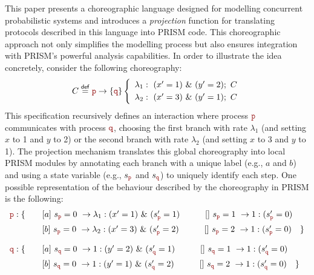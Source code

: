 This paper presents a choreographic language designed for modelling
concurrent probabilistic systems and introduces a {\em projection}
function for translating protocols described in this language into
PRISM code. This choreographic approach not only simplifies the
modelling process but also ensures integration with PRISM's powerful
analysis capabilities.
In order to illustrate the idea concretely, consider the following
choreography:
\[
  \begin{array}{lll}
    C \stackrel{\mathsf{def}}{=} \interactBase{\nr}{\nrr}
    \left\{
    \begin{array}{lll}
      \lambda_1: \ (x'=1)\ \&\ (y'=2);\ C\\[1mm]
      \lambda_2: \ (x'=3)\ \&\ (y'=1);\ C
    \end{array}
    \right.
  \end{array}
\]
This specification recursively defines an interaction where process
\(\role{p}\) communicates with process \(\role{q}\), choosing the
first branch with rate $\lambda_1$ (and setting \(x\) to 1 and \(y\)
to 2) or the second branch with rate $\lambda_2$ (and setting \(x\) to
3 and \(y\) to 1). 
The projection mechanism translates this global choreography into
local PRISM modules by annotating each branch with a unique label
(e.g., $a$ and $b$) and using a state variable (e.g., \(s_{\role p}\)
and \(s_{\role q}\)) to uniquely identify each step.
One possible representation of the behaviour described by the
choreography in PRISM is the following:
\[
\begin{array}{llll}
\role{p}: \{ & \quad \commandBase {a}{s_{\role p}=0} {\lambda_1:(x'=1)\ \&\ (s_{\role p}'=1)} \quad\qquad \commandBase {}{s_{\role p}=1} {1:(s_{\role p}'=0)}\\[2mm]
              & \quad \commandBase {b}{s_{\role p}=0} {\lambda_2:(x'=3)\ \&\ (s_{\role p}'=2)} \quad\qquad \commandBase {}{s_{\role p}=2} {1:(s_{\role p}'=0)} \quad \}\\[4mm]
\role{q}: \{ & \quad \commandBase {a}{s_{\role q}=0} {1:(y'=2)\ \&\ (s_{\role q}'=1)} \qquad\quad \commandBase {}{s_{\role q}=1} {1:(s_{\role q}'=0)}\\[2mm]
              & \quad \commandBase {b}{s_{\role q}=0} {1:(y'=1)\ \&\ (s_{\role q}'=2)} \qquad\quad \commandBase {}{s_{\role q}=2} {1:(s_{\role q}'=0)} \quad \}\\
\end{array}
\]
